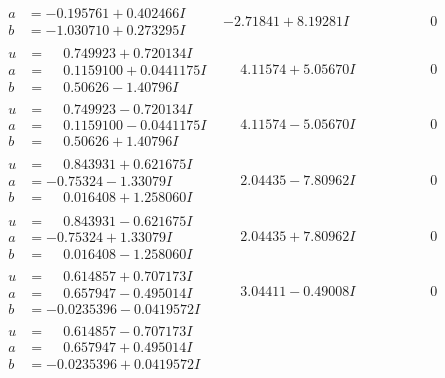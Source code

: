 \documentclass[1p]{elsarticle_modified}
\theoremstyle{definition}
\begin{document}
$$\begin{array}{c|c|c}
\begin{aligned}
a &= -0.195761 + 0.402466 I \\
b &= -1.030710 + 0.273295 I\end{aligned}
 & -2.71841 + 8.19281 I & \phantom{-0.000000 } 0 \\ \hline\begin{aligned}
u &= \phantom{-}0.749923 + 0.720134 I \\
a &= \phantom{-}0.1159100 + 0.0441175 I \\
b &= \phantom{-}0.50626 - 1.40796 I\end{aligned}
 & \phantom{-}4.11574 + 5.05670 I & \phantom{-0.000000 } 0 \\ \hline\begin{aligned}
u &= \phantom{-}0.749923 - 0.720134 I \\
a &= \phantom{-}0.1159100 - 0.0441175 I \\
b &= \phantom{-}0.50626 + 1.40796 I\end{aligned}
 & \phantom{-}4.11574 - 5.05670 I & \phantom{-0.000000 } 0 \\ \hline\begin{aligned}
u &= \phantom{-}0.843931 + 0.621675 I \\
a &= -0.75324 - 1.33079 I \\
b &= \phantom{-}0.016408 + 1.258060 I\end{aligned}
 & \phantom{-}2.04435 - 7.80962 I & \phantom{-0.000000 } 0 \\ \hline\begin{aligned}
u &= \phantom{-}0.843931 - 0.621675 I \\
a &= -0.75324 + 1.33079 I \\
b &= \phantom{-}0.016408 - 1.258060 I\end{aligned}
 & \phantom{-}2.04435 + 7.80962 I & \phantom{-0.000000 } 0 \\ \hline\begin{aligned}
u &= \phantom{-}0.614857 + 0.707173 I \\
a &= \phantom{-}0.657947 - 0.495014 I \\
b &= -0.0235396 - 0.0419572 I\end{aligned}
 & \phantom{-}3.04411 - 0.49008 I & \phantom{-0.000000 } 0 \\ \hline\begin{aligned}
u &= \phantom{-}0.614857 - 0.707173 I \\
a &= \phantom{-}0.657947 + 0.495014 I \\
b &= -0.0235396 + 0.0419572 I\end{aligned}

\end{array}$$
\end{document}
